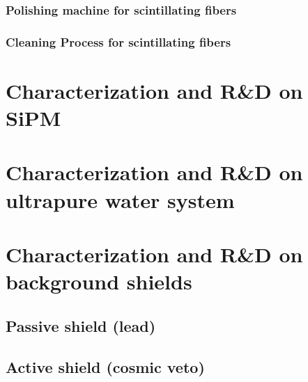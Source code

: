 \documentclass[12pt,a4paper]{book}
\begin{document}
		
		\subsubsection{Polishing machine for scintillating fibers}%
		\label{subsubsec:PolishingMachine}
		
		\subsubsection{Cleaning Process for scintillating fibers}%
		\label{subsubsec:CleaningProcess}
		\newpage
		
		
	\section[Characterization SiPM]{Characterization and R\&D on SiPM}
	\label{sec:CharacterizationSiPM}
	\newpage
	
	\section[Characetrization water system]{Characterization and R\&D on ultrapure water system}
	\label{sec:CharacterizationUltraPureWaterSystem}
	\newpage
		
	\section[Characterization shields]{Characterization and R\&D on background shields}
	\label{sec:RyDBackground}
	
	\subsection{Passive shield (lead)}
	 \label{subsec:CharacterizationPassiveShield}
					 
	\subsection{Active shield (cosmic veto)} %
	\label{subsec:CharacterizationActiveShield}
\end{document}
